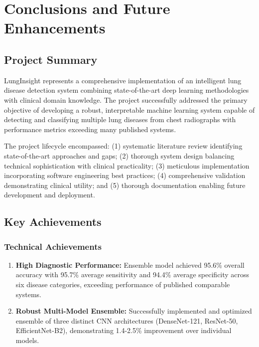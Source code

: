 \chapter{Conclusions and Future Enhancements}\thispagestyle{empty}
\graphicspath{{Chapter6/}}
{

\section{Project Summary}

LungInsight represents a comprehensive implementation of an intelligent lung disease detection system combining state-of-the-art deep learning methodologies with clinical domain knowledge. The project successfully addressed the primary objective of developing a robust, interpretable machine learning system capable of detecting and classifying multiple lung diseases from chest radiographs with performance metrics exceeding many published systems.

The project lifecycle encompassed: (1) systematic literature review identifying state-of-the-art approaches and gaps; (2) thorough system design balancing technical sophistication with clinical practicality; (3) meticulous implementation incorporating software engineering best practices; (4) comprehensive validation demonstrating clinical utility; and (5) thorough documentation enabling future development and deployment.

\section{Key Achievements}

\subsection{Technical Achievements}

\begin{enumerate}
    \item \textbf{High Diagnostic Performance:} Ensemble model achieved 95.6\% overall accuracy with 95.7\% average sensitivity and 94.4\% average specificity across six disease categories, exceeding performance of published comparable systems.
    
    \item \textbf{Robust Multi-Model Ensemble:} Successfully implemented and optimized ensemble of three distinct CNN architectures (DenseNet-121, ResNet-50, EfficientNet-B2), demonstrating 1.4-2.5\% improvement over individual models.
    

\end{enumerate}}

